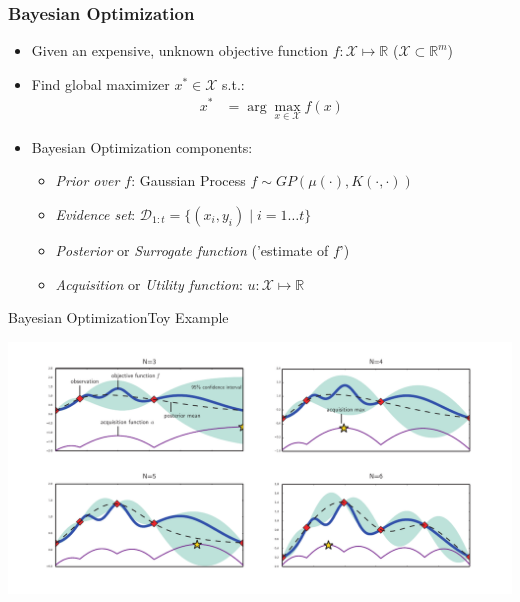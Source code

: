 \begingroup
{}

\begin{frame}
\hypertarget{extras}{}
	\frametitle{Bayesian Optimization}
	\begin{itemize}
		\item Given an expensive, unknown objective function $f: \mathcal{X} \mapsto \mathbb{R}$ ($\mathcal{X} \subset \mathbb{R}^m$)
		\item Find global maximizer $x^* \in \mathcal{X}$ s.t.:
		\begin{align*}
		x^* &= \arg\max_{x \in \mathcal{X}} f(x)
		\end{align*}
		\item Bayesian Optimization components:
		\begin{itemize}
			\item \textit{Prior over $f$}: Gaussian Process $f \sim GP(\mu(\cdot), K(\cdot, \cdot))$	%
			\item \textit{Evidence set}: $\mathcal{D}_{1:t} = \{(x_i, y_i) \mid i = 1 \ldots t\}$
			\item \textit{Posterior} or \textit{Surrogate function} ('estimate of $f$')
			\item \textit{Acquisition} or \textit{Utility function}: $u: \mathcal{X} \mapsto \mathbb{R}$ 
		\end{itemize}
	\end{itemize}
\end{frame}

\begin{frame}{Bayesian Optimization}{Toy Example}
\vspace{-8pt}
\begin{center}
	\includegraphics[width=\textwidth]{figures/bo_toy_example_v1.pdf}
\end{center}
\end{frame}

